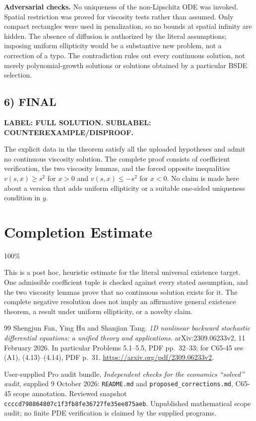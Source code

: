 \documentclass[11pt,a4paper]{article}
\theoremstyle{definition}
\newcommand{\disproof}{\textbf{LABEL: FULL SOLUTION. SUBLABEL: COUNTEREXAMPLE/DISPROOF.}}
\begin{document}
\textbf{Adversarial checks.} No uniqueness of the non-Lipschitz ODE was invoked. Spatial restriction was proved for viscosity tests rather than assumed. Only compact rectangles were used in penalization, so no bounds at spatial infinity are hidden. The absence of diffusion is authorized by the literal assumptions; imposing uniform ellipticity would be a substantive new problem, not a correction of a typo. The contradiction rules out every continuous solution, not merely polynomial-growth solutions or solutions obtained by a particular BSDE selection.

\subsection*{6) FINAL}
\disproof

The explicit data in the theorem satisfy all the uploaded hypotheses and admit no continuous viscosity solution. The complete proof consists of coefficient verification, the two viscosity lemmas, and the forced opposite inequalities $v(s,x)\ge s^2$ for $x>0$ and $v(s,x)\le-s^2$ for $x<0$. No claim is made here about a version that adds uniform ellipticity or a suitable one-sided uniqueness condition in $y$.

\section{Completion Estimate}
100\%

This is a post hoc, heuristic estimate for the literal universal existence target.
One admissible coefficient tuple is checked against every stated assumption,
and the two viscosity lemmas prove that no continuous solution exists for it.
The complete negative resolution does not imply an affirmative general
existence theorem, a result under uniform ellipticity, or a novelty claim.

\clearpage
\begin{thebibliography}{99}
Shengjun Fan, Ying Hu and Shanjian Tang. \emph{1D nonlinear backward stochastic differential equations: a unified theory and applications}. arXiv:2309.06233v2, 11 February 2026. In particular Problems 5.1--5.5, PDF pp.\ 32--33; for C65-45 see (A1), (4.13)--(4.14), PDF p.\ 31. \url{https://arxiv.org/pdf/2309.06233v2}.

User-supplied Pro audit bundle, \emph{Independent checks for the economics
``solved'' audit}, supplied 9 October 2026: \texttt{README.md} and
\texttt{proposed\_corrections.md}, C65-45 scope annotation. Reviewed
snapshot \texttt{ccccd798864807c1f3fb8fe36727fe35ee875aeb}.
Unpublished mathematical scope audit; no finite PDE verification is
claimed by the supplied programs.

\end{thebibliography}
\end{document}
